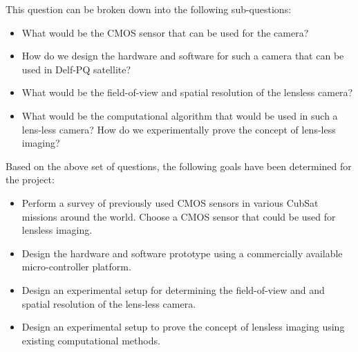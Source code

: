 This question can be broken down into the following sub-questions:
\begin{itemize}
\item What would be the CMOS sensor that can be used for the camera? 
\item How do we design the hardware and software for such a camera that can be used in Delf-PQ satellite?
\item What would be the field-of-view and spatial resolution of the lensless camera?
\item What would be the computational algorithm that would be used in such a lens-less camera? How do we experimentally prove the concept of lens-less imaging?

\end{itemize}

Based on the above set of questions, the following goals have been determined for the project:
\begin{itemize}
\item Perform a survey of previously used CMOS sensors in various CubSat missions around the world. Choose a CMOS sensor that could be used for lensless imaging.
\item Design the hardware and software prototype using a commercially available micro-controller platform.
\item Design an experimental setup for determining the field-of-view and and spatial resolution of the lens-less camera.
\item Design an experimental setup to prove the concept of lensless imaging using existing computational methods. 
\end{itemize}
